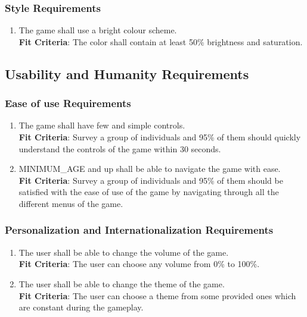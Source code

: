\documentclass[12pt, titlepage]{article}
\begin{document}
\subsubsection{Style Requirements}
\begin{enumerate}[leftmargin=1.20cm, label={LF \arabic*}]
    \item  The game shall use a bright colour scheme.\\
    \textbf{Fit Criteria}: The color shall contain at least 50\% brightness and saturation.  
\end{enumerate}

\subsection{Usability and Humanity Requirements}
\subsubsection{Ease of use Requirements}
\begin{enumerate}[leftmargin=1.45cm, label={UH\ \arabic*}]
    \item The game shall have few and simple controls.\\
    \textbf{Fit Criteria}: Survey a group of individuals and 95\% of them should quickly understand the controls of the game within 30 seconds. 
    \item MINIMUM\_AGE and up shall be able to navigate the game with ease.\\
    \textbf{Fit Criteria}: Survey a group of individuals and 95\% of them should be satisfied with the ease of use of the game by navigating through all the different menus of the game. 
\end{enumerate}

\subsubsection{Personalization and Internationalization Requirements}
\begin{enumerate}[leftmargin=1.45cm, label={UH \arabic*}]
    \item The user shall be able to change the volume of the game.\\
    \textbf{Fit Criteria}: The user can choose any volume from 0\% to 100\%.
    \item The user shall be able to change the theme of the game.\\
    \textbf{Fit Criteria}: The user can choose a theme from some provided ones which are constant during the gameplay.
\end{enumerate}
\end{document}

